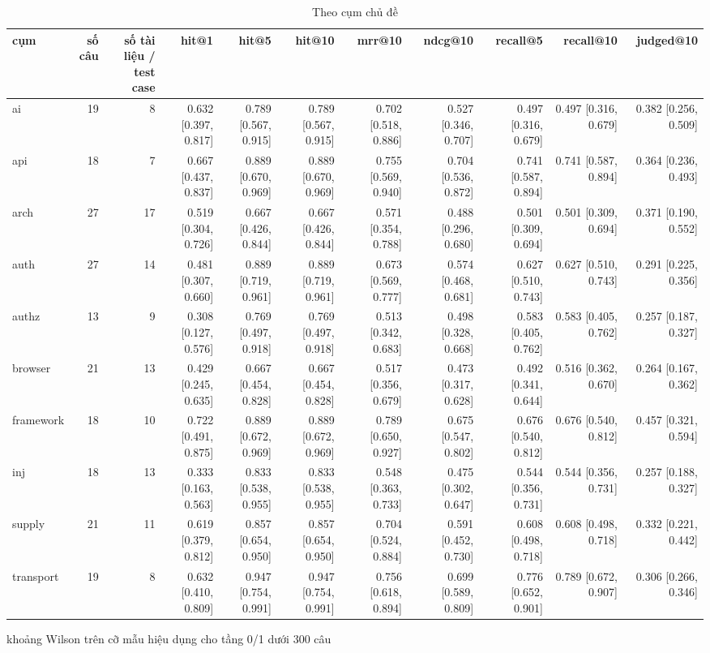 \begin{table}[ht]
\centering
\caption{Theo cụm chủ đề}
\begin{tabular}{lrrrrrrrrrr}
\toprule
cụm & số câu & số tài liệu / test case & hit@1 & hit@5 & hit@10 & mrr@10 & ndcg@10 & recall@5 & recall@10 & judged@10 \\
\midrule
ai & 19 & 8 & 0.632 [0.397, 0.817] & 0.789 [0.567, 0.915] & 0.789 [0.567, 0.915] & 0.702 [0.518, 0.886] & 0.527 [0.346, 0.707] & 0.497 [0.316, 0.679] & 0.497 [0.316, 0.679] & 0.382 [0.256, 0.509] \\
api & 18 & 7 & 0.667 [0.437, 0.837] & 0.889 [0.670, 0.969] & 0.889 [0.670, 0.969] & 0.755 [0.569, 0.940] & 0.704 [0.536, 0.872] & 0.741 [0.587, 0.894] & 0.741 [0.587, 0.894] & 0.364 [0.236, 0.493] \\
arch & 27 & 17 & 0.519 [0.304, 0.726] & 0.667 [0.426, 0.844] & 0.667 [0.426, 0.844] & 0.571 [0.354, 0.788] & 0.488 [0.296, 0.680] & 0.501 [0.309, 0.694] & 0.501 [0.309, 0.694] & 0.371 [0.190, 0.552] \\
auth & 27 & 14 & 0.481 [0.307, 0.660] & 0.889 [0.719, 0.961] & 0.889 [0.719, 0.961] & 0.673 [0.569, 0.777] & 0.574 [0.468, 0.681] & 0.627 [0.510, 0.743] & 0.627 [0.510, 0.743] & 0.291 [0.225, 0.356] \\
authz & 13 & 9 & 0.308 [0.127, 0.576] & 0.769 [0.497, 0.918] & 0.769 [0.497, 0.918] & 0.513 [0.342, 0.683] & 0.498 [0.328, 0.668] & 0.583 [0.405, 0.762] & 0.583 [0.405, 0.762] & 0.257 [0.187, 0.327] \\
browser & 21 & 13 & 0.429 [0.245, 0.635] & 0.667 [0.454, 0.828] & 0.667 [0.454, 0.828] & 0.517 [0.356, 0.679] & 0.473 [0.317, 0.628] & 0.492 [0.341, 0.644] & 0.516 [0.362, 0.670] & 0.264 [0.167, 0.362] \\
framework & 18 & 10 & 0.722 [0.491, 0.875] & 0.889 [0.672, 0.969] & 0.889 [0.672, 0.969] & 0.789 [0.650, 0.927] & 0.675 [0.547, 0.802] & 0.676 [0.540, 0.812] & 0.676 [0.540, 0.812] & 0.457 [0.321, 0.594] \\
inj & 18 & 13 & 0.333 [0.163, 0.563] & 0.833 [0.538, 0.955] & 0.833 [0.538, 0.955] & 0.548 [0.363, 0.733] & 0.475 [0.302, 0.647] & 0.544 [0.356, 0.731] & 0.544 [0.356, 0.731] & 0.257 [0.188, 0.327] \\
supply & 21 & 11 & 0.619 [0.379, 0.812] & 0.857 [0.654, 0.950] & 0.857 [0.654, 0.950] & 0.704 [0.524, 0.884] & 0.591 [0.452, 0.730] & 0.608 [0.498, 0.718] & 0.608 [0.498, 0.718] & 0.332 [0.221, 0.442] \\
transport & 19 & 8 & 0.632 [0.410, 0.809] & 0.947 [0.754, 0.991] & 0.947 [0.754, 0.991] & 0.756 [0.618, 0.894] & 0.699 [0.589, 0.809] & 0.776 [0.652, 0.901] & 0.789 [0.672, 0.907] & 0.306 [0.266, 0.346] \\
\bottomrule
\end{tabular}
\par\smallskip\footnotesize khoảng Wilson trên cỡ mẫu hiệu dụng cho tầng 0/1 dưới 300 câu
\end{table}

